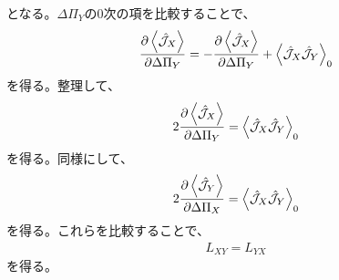 \documentclass[a4paper,11pt]{jsarticle}
\begin{document}
となる。$\Delta \Pi_Y$の0次の項を比較することで、
\begin{align}
    \pdv{\ev{\hat{\mathcal{J}}_X}}{\Delta \Pi_Y} = -\pdv{\ev{\hat{\mathcal{J}}_X}}{\Delta \Pi_Y} + \ev{\hat{\mathcal{J}}_X \hat{\mathcal{J}}_Y}_0
\end{align}
を得る。整理して、
\begin{align}
    2\pdv{\ev{\hat{\mathcal{J}}_X}}{\Delta \Pi_Y} = \ev{\hat{\mathcal{J}}_X \hat{\mathcal{J}}_Y}_0
\end{align}
を得る。同様にして、
\begin{align}
    2\pdv{\ev{\hat{\mathcal{J}}_Y}}{\Delta \Pi_X} = \ev{\hat{\mathcal{J}}_X \hat{\mathcal{J}}_Y}_0
\end{align}
を得る。これらを比較することで、
\begin{align}
    L_{XY} = L_{YX}
\end{align}
を得る。\hfill \qedsymbol
\end{document}
